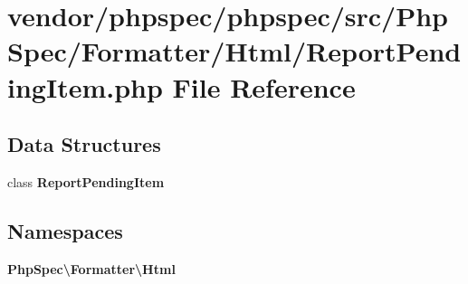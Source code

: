 \section{vendor/phpspec/phpspec/src/\+Php\+Spec/\+Formatter/\+Html/\+Report\+Pending\+Item.php File Reference}
\label{_report_pending_item_8php}
\subsection*{Data Structures}
\begin{DoxyCompactItemize}
\item 
class {\bf Report\+Pending\+Item}
\end{DoxyCompactItemize}
\subsection*{Namespaces}
\begin{DoxyCompactItemize}
\item 
 {\bf Php\+Spec\textbackslash{}\+Formatter\textbackslash{}\+Html}
\end{DoxyCompactItemize}
